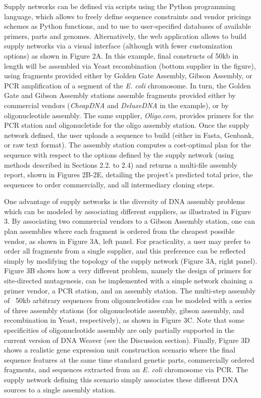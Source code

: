 Supply networks can be defined via scripts using the Python programming language, which allows to freely define sequence constraints and vendor pricings schemes as Python functions, and to use to user-specified databases of available primers, parts and genomes. Alternatively, the web application allows to build supply networks via a visual interface (although with fewer customization options) as shown in Figure 2A. In this example, final constructs of 50kb in length will be assembled via Yeast recombination (bottom supplier in the figure), using fragments provided either by Golden Gate Assembly, Gibson Assembly, or PCR amplification of a segment of the \textit{E. coli} chromosome. In turn, the Golden Gate and Gibson Assembly stations assemble fragments provided either by commercial vendors (\textit{CheapDNA} and \textit{DeluxeDNA} in the example), or by oligonucleotide assembly. The same supplier, \textit{Oligo.com}, provides primers for the PCR station and oligonucletide for the oligo assembly station.
Once the supply network defined, the user uploads a sequence to build (either in Fasta, Genbank, or raw text format). The assembly station computes a cost-optimal plan for the sequence with respect to the options defined by the supply network (using methods described in Sections 2.2. to 2.4) and returns a
multi-file assembly report, shown in Figures 2B-2E, detailing the project's predicted total price, the sequences to order commercially, and all intermediary cloning steps.

One advantage of supply networks is the diversity of DNA assembly problems which can be modeled by associating different suppliers, as illustrated in Figure 3. By associating two commercial vendors to a Gibson Assembly station, one can plan assemblies where each fragment is ordered from the cheapest possible vendor, as shown in Figure 3A, left panel. For practicality, a user may prefer to order all fragments from a single supplier, and this preference can be reflected simply by modifying the topology of the supply network (Figure 3A, right panel). Figure 3B shows how a very different problem, namely the design of primers for site-directed mutagenesis, can be implemented with a simple network chaining a primer vendor, a PCR station, and an assembly station. The multi-step assembly of ~50kb arbitrary sequences from oligonucleotides can be modeled with a series of three assembly stations (for oligonucleotide assembly, gibson assembly, and recombination in Yeast, respectively), as shown in Figure 3C. Note that some specificities of oligonucleotide assembly are only partially supported in the current version of DNA Weaver (see the Discussion section). Finally, Figure 3D shows a realistic gene expression unit construction scenario where the final sequence features at the same time standard genetic parts, commercially ordered fragments, and sequences extracted from an \textit{E. coli} chromosome via PCR. The supply network defining this scenario simply associates these different DNA sources to a single assembly station.


